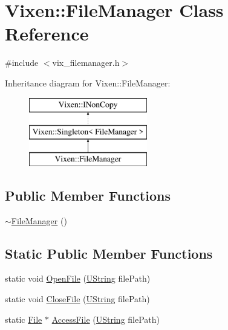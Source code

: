 \hypertarget{classVixen_1_1FileManager}{}\section{Vixen\+:\+:File\+Manager Class Reference}
\label{classVixen_1_1FileManager}


{\ttfamily \#include $<$vix\+\_\+filemanager.\+h$>$}

Inheritance diagram for Vixen\+:\+:File\+Manager\+:\begin{figure}[H]
\begin{center}
\leavevmode
\includegraphics[height=3.000000cm]{classVixen_1_1FileManager}
\end{center}
\end{figure}
\subsection*{Public Member Functions}
\begin{DoxyCompactItemize}
\item 
\hyperlink{classVixen_1_1FileManager_abdbeed26d1b9d2014b5b735365c3fecb}{$\sim$\+File\+Manager} ()
\end{DoxyCompactItemize}
\subsection*{Static Public Member Functions}
\begin{DoxyCompactItemize}
\item 
static void \hyperlink{classVixen_1_1FileManager_a3c93be5972cbc9a8460d6177bff29e58}{Open\+File} (\hyperlink{vix__stringutil_8h_a561c282c415a5c38fd9a26325701e3bf}{U\+String} file\+Path)
\item 
static void \hyperlink{classVixen_1_1FileManager_a36342248ec7f83ff8917a6a210707266}{Close\+File} (\hyperlink{vix__stringutil_8h_a561c282c415a5c38fd9a26325701e3bf}{U\+String} file\+Path)
\item 
static \hyperlink{classVixen_1_1File}{File} $\ast$ \hyperlink{classVixen_1_1FileManager_a6f2939cb810556b9cc6ef63b0f7131e8}{Access\+File} (\hyperlink{vix__stringutil_8h_a561c282c415a5c38fd9a26325701e3bf}{U\+String} file\+Path)
\end{DoxyCompactItemize}
